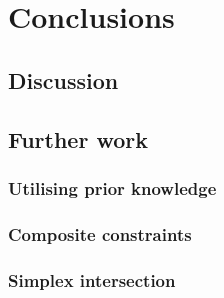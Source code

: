 \documentclass[../../main.tex]{subfiles}
\begin{document}
\chapter{Conclusions}

\section{Discussion}
\section{Further work}
\subsection{Utilising prior knowledge}
\subsection{Composite constraints}
\subsection{Simplex intersection}
\end{document}
